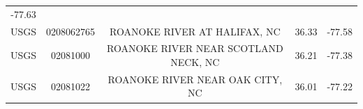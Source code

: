\documentclass[12pt,]{article}
\begin{document}
\begin{longtable}[]{@{}ccccc@{}}
\begin{minipage}[t]{0.12\columnwidth}
-77.63\strut
\end{minipage}\tabularnewline
\begin{minipage}[t]{0.10\columnwidth}\centering\strut
USGS\strut
\end{minipage} & \begin{minipage}[t]{0.15\columnwidth}\centering\strut
0208062765\strut
\end{minipage} & \begin{minipage}[t]{0.36\columnwidth}\centering\strut
ROANOKE RIVER AT HALIFAX, NC\strut
\end{minipage} & \begin{minipage}[t]{0.12\columnwidth}\centering\strut
36.33\strut
\end{minipage} & \begin{minipage}[t]{0.12\columnwidth}\centering\strut
-77.58\strut
\end{minipage}\tabularnewline
\begin{minipage}[t]{0.10\columnwidth}\centering\strut
USGS\strut
\end{minipage} & \begin{minipage}[t]{0.15\columnwidth}\centering\strut
02081000\strut
\end{minipage} & \begin{minipage}[t]{0.36\columnwidth}\centering\strut
ROANOKE RIVER NEAR SCOTLAND NECK, NC\strut
\end{minipage} & \begin{minipage}[t]{0.12\columnwidth}\centering\strut
36.21\strut
\end{minipage} & \begin{minipage}[t]{0.12\columnwidth}\centering\strut
-77.38\strut
\end{minipage}\tabularnewline
\begin{minipage}[t]{0.10\columnwidth}\centering\strut
USGS\strut
\end{minipage} & \begin{minipage}[t]{0.15\columnwidth}\centering\strut
02081022\strut
\end{minipage} & \begin{minipage}[t]{0.36\columnwidth}\centering\strut
ROANOKE RIVER NEAR OAK CITY, NC\strut
\end{minipage} & \begin{minipage}[t]{0.12\columnwidth}\centering\strut
36.01\strut
\end{minipage} & \begin{minipage}[t]{0.12\columnwidth}\centering\strut
-77.22\strut
\end{minipage}\tabularnewline

\end{longtable}
\end{document}
